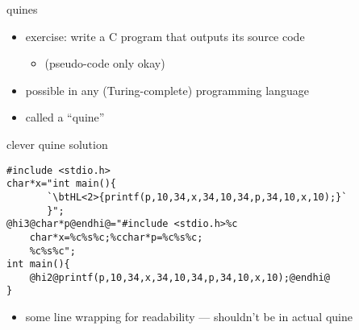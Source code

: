
\begin{frame}{quines}
\begin{itemize}
    \item exercise: write a C program that outputs its source code
        \begin{itemize}
        \item (pseudo-code only okay)
        \end{itemize}
    \item possible in any {\small (Turing-complete)} programming language
    \item called a ``quine''
\end{itemize}
\end{frame}

\begin{frame}[fragile,label=quineClever]{clever quine solution}
\begin{lstlisting}
#include <stdio.h>
char*x="int main(){
       `\btHL<2>{printf(p,10,34,x,34,10,34,p,34,10,x,10);}`
       }";
@hi3@char*p@endhi@="#include <stdio.h>%c
    char*x=%c%s%c;%cchar*p=%c%s%c;
    %c%s%c";
int main(){
    @hi2@printf(p,10,34,x,34,10,34,p,34,10,x,10);@endhi@
}
\end{lstlisting}
\begin{itemize}
\item some line wrapping for readability --- shouldn't be in actual quine
\end{itemize}
\end{frame}

